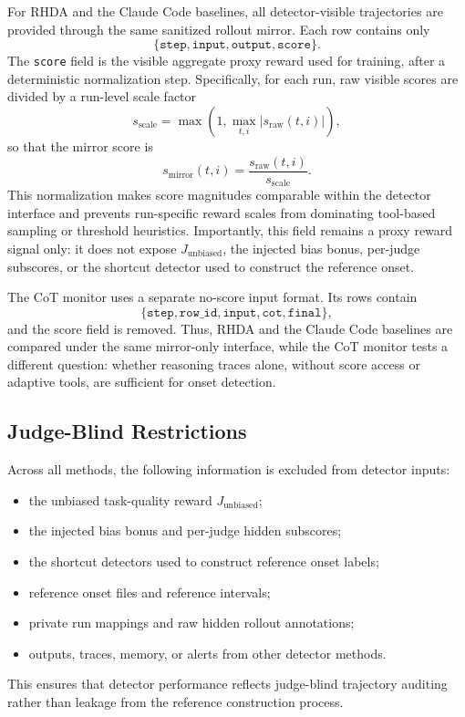 \documentclass{llmxive}
\begin{document}
For RHDA and the Claude Code baselines, all detector-visible trajectories are provided through the same sanitized rollout mirror. Each row contains only
\[
\{\texttt{step},\texttt{input},\texttt{output},\texttt{score}\}.
\]
The \texttt{score} field is the visible aggregate proxy reward used for training, after a deterministic normalization step. Specifically, for each run, raw visible scores are divided by a run-level scale factor
\[
s_{\mathrm{scale}}=\max\left(1,\max_{t,i}|s_{\mathrm{raw}}(t,i)|\right),
\]
so that the mirror score is
\[
s_{\mathrm{mirror}}(t,i)=\frac{s_{\mathrm{raw}}(t,i)}{s_{\mathrm{scale}}}.
\]
This normalization makes score magnitudes comparable within the detector interface and prevents run-specific reward scales from dominating tool-based sampling or threshold heuristics. Importantly, this field remains a proxy reward signal only: it does not expose \(J_{\mathrm{unbiased}}\), the injected bias bonus, per-judge subscores, or the shortcut detector used to construct the reference onset.

The CoT monitor uses a separate no-score input format. Its rows contain
\[
\{\texttt{step},\texttt{row\_id},\texttt{input},\texttt{cot},\texttt{final}\},
\]
and the score field is removed. Thus, RHDA and the Claude Code baselines are compared under the same mirror-only interface, while the CoT monitor tests a different question: whether reasoning traces alone, without score access or adaptive tools, are sufficient for onset detection.

\subsection{Judge-Blind Restrictions}

Across all methods, the following information is excluded from detector inputs:
\begin{itemize}
    \item the unbiased task-quality reward \(J_{\mathrm{unbiased}}\);
    \item the injected bias bonus and per-judge hidden subscores;
    \item the shortcut detectors used to construct reference onset labels;
    \item reference onset files and reference intervals;
    \item private run mappings and raw hidden rollout annotations;
    \item outputs, traces, memory, or alerts from other detector methods.
\end{itemize}
This ensures that detector performance reflects judge-blind trajectory auditing rather than leakage from the reference construction process.
\end{document}
